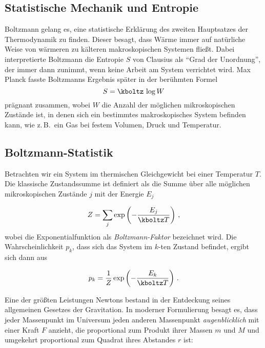 \documentclass{scrartcl}
\begin{document}
\subsection*{Statistische Mechanik und Entropie}

Boltzmann gelang es, eine statistische Erklärung des zweiten Hauptsatzes der Thermodynamik zu finden. Dieser besagt, dass Wärme immer auf natürliche Weise von wärmeren zu kälteren makroskopischen Systemen fließt. Dabei interpretierte Boltzmann die Entropie $S$ von Clausius als \enquote{Grad der Unordnung}, der immer dann zunimmt, wenn keine Arbeit am System verrichtet wird. Max Planck fasste Boltzmanns Ergebnis später in der berühmten Formel 
%
\begin{equation*}\label{eq:ideal-nr}
  S=\kboltz\, \log W
\end{equation*}
%
prägnant zusammen, wobei $W$ die Anzahl der möglichen mikroskopischen Zustände ist, in denen sich ein bestimmtes makroskopisches System befinden kann, wie z.\,B.\ ein Gas bei festem Volumen, Druck und Temperatur.


\subsection*{Boltzmann-Statistik}

Betrachten wir ein System im thermischen Gleichgewicht bei einer Temperatur $T$. Die klassische Zustandssumme ist definiert als die Summe über alle möglichen mikroskopischen Zustände $j$ mit der Energie $E_j$

\begin{equation*}\label{eq:ideal-nr}
  Z=\sum_j \exp \left(-\frac{E_j}{\kboltz T}\right)\,,
\end{equation*}
%
wobei die Exponentialfunktion als \emph{Boltzmann-Faktor} bezeichnet wird. Die Wahrscheinlichkeit $p_k$, dass sich das System im $k$-ten Zustand befindet, ergibt sich dann aus

\begin{equation*}\label{eq:ideal-nr}
  p_k=\frac{1}{Z} \exp \left(-\frac{E_k}{\kboltz T}\right)\,.
\end{equation*}


\newpage
{}
\label{sec:1000}

Eine der größten Leistungen Newtons bestand in der Entdeckung seines allgemeinen Gesetzes der Gravitation. In moderner Formulierung besagt es, dass jeder Massenpunkt im Universum jeden anderen Massenpunkt \emph{augenblicklich} mit einer Kraft $F$ anzieht, die proportional zum Produkt ihrer Massen $m$ und $M$ und umgekehrt proportional zum Quadrat ihres Abstandes $r$ ist:
\end{document}
